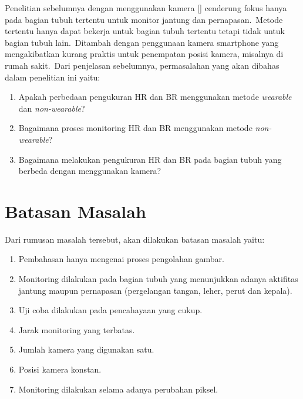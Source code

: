 Penelitian sebelumnya dengan menggunakan kamera [\citet{lazaro2014,nam2014}] cenderung fokus hanya pada bagian tubuh tertentu untuk monitor jantung dan pernapasan.~Metode tertentu hanya dapat bekerja untuk bagian tubuh tertentu tetapi tidak untuk bagian tubuh lain.~Ditambah dengan penggunaan kamera smartphone yang mengakibatkan kurang praktis untuk penempatan posisi kamera, misalnya di rumah sakit.~Dari penjelasan sebelumnya, permasalahan yang akan dibahas dalam penelitian ini yaitu:
\begin{enumerate}
\item Apakah perbedaan pengukuran HR dan BR menggunakan metode \textit{wearable} dan \textit{non-wearable}?
\item Bagaimana proses monitoring HR dan BR menggunakan metode \textit{non-wearable}?
\item Bagaimana melakukan pengukuran HR dan BR pada bagian tubuh yang berbeda dengan menggunakan kamera?
\end{enumerate}


\section{Batasan Masalah}  %

Dari rumusan masalah tersebut, akan dilakukan batasan masalah yaitu:
\begin{enumerate}
	\item Pembahasan hanya mengenai proses pengolahan gambar.
	\item Monitoring dilakukan pada bagian tubuh yang menunjukkan adanya aktifitas jantung maupun pernapasan (pergelangan tangan, leher, perut dan kepala).
	\item Uji coba dilakukan pada pencahayaan yang cukup.
	\item Jarak monitoring yang terbatas.
	\item Jumlah kamera yang digunakan satu.
	\item Posisi kamera konstan.
	\item Monitoring dilakukan selama adanya perubahan piksel.
	
\end{enumerate}

